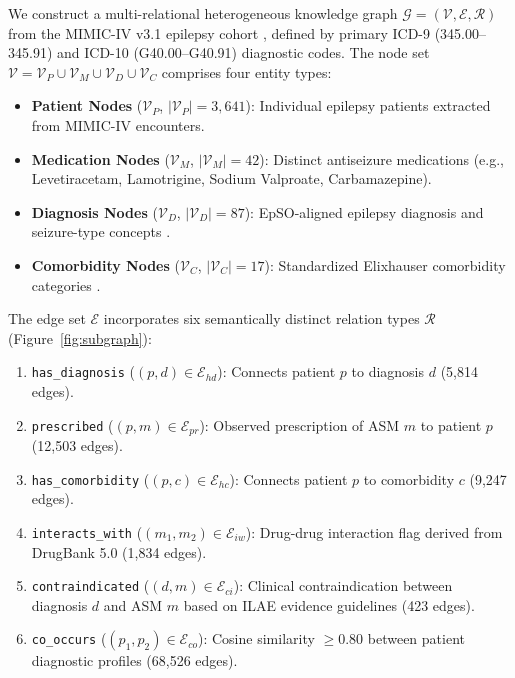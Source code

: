\documentclass[11pt,a4paper]{article}
\begin{document}
We construct a multi-relational heterogeneous knowledge graph $\mathcal{G} = (\mathcal{V}, \mathcal{E}, \mathcal{R})$ from the MIMIC-IV v3.1 epilepsy cohort \cite{johnson2024mimic}, defined by primary ICD-9 (345.00--345.91) and ICD-10 (G40.00--G40.91) diagnostic codes. The node set $\mathcal{V} = \mathcal{V}_P \cup \mathcal{V}_M \cup \mathcal{V}_D \cup \mathcal{V}_C$ comprises four entity types:
\begin{itemize}[leftmargin=*]
    \item \textbf{Patient Nodes} ($\mathcal{V}_P$, $|\mathcal{V}_P| = 3,641$): Individual epilepsy patients extracted from MIMIC-IV encounters.
    \item \textbf{Medication Nodes} ($\mathcal{V}_M$, $|\mathcal{V}_M| = 42$): Distinct antiseizure medications (e.g., Levetiracetam, Lamotrigine, Sodium Valproate, Carbamazepine).
    \item \textbf{Diagnosis Nodes} ($\mathcal{V}_D$, $|\mathcal{V}_D| = 87$): EpSO-aligned epilepsy diagnosis and seizure-type concepts \cite{sahoo2014epso, fisher2017instruction}.
    \item \textbf{Comorbidity Nodes} ($\mathcal{V}_C$, $|\mathcal{V}_C| = 17$): Standardized Elixhauser comorbidity categories \cite{elixhauser1998comorbidity}.
\end{itemize}

The edge set $\mathcal{E}$ incorporates six semantically distinct relation types $\mathcal{R}$ (Figure~\ref{fig:subgraph}):
\begin{enumerate}
    \item \texttt{has\_diagnosis} ($(p, d) \in \mathcal{E}_{hd}$): Connects patient $p$ to diagnosis $d$ (5,814 edges).
    \item \texttt{prescribed} ($(p, m) \in \mathcal{E}_{pr}$): Observed prescription of ASM $m$ to patient $p$ (12,503 edges).
    \item \texttt{has\_comorbidity} ($(p, c) \in \mathcal{E}_{hc}$): Connects patient $p$ to comorbidity $c$ (9,247 edges).
    \item \texttt{interacts\_with} ($(m_1, m_2) \in \mathcal{E}_{iw}$): Drug-drug interaction flag derived from DrugBank 5.0 \cite{wishart2018drugbank} (1,834 edges).
    \item \texttt{contraindicated} ($(d, m) \in \mathcal{E}_{ci}$): Clinical contraindication between diagnosis $d$ and ASM $m$ based on ILAE evidence guidelines \cite{glauser2013ilae, trinka2015definition} (423 edges).
    \item \texttt{co\_occurs} ($(p_1, p_2) \in \mathcal{E}_{co}$): Cosine similarity $\ge 0.80$ between patient diagnostic profiles (68,526 edges).
\end{enumerate}
\end{document}
